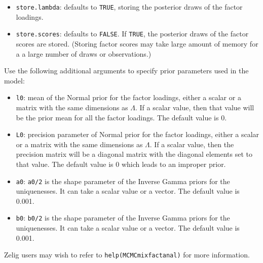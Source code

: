 \begin{itemize}
\item \texttt{store.lambda}: defaults to {\tt TRUE}, storing the
posterior draws of the factor loadings.  

\item \texttt{store.scores}: defaults to {\tt FALSE}.  If {\tt TRUE},
the posterior draws of the factor scores are stored. (Storing factor
scores may take large amount of memory for a a large number of draws
or observations.)

\end{itemize}
Use the following additional arguments to specify prior parameters used in the model:
\begin{itemize}

\item \texttt{l0}: mean of the Normal prior for the factor
loadings, either a scalar or a matrix with the same dimensions as
$\Lambda$.  If a scalar value, then that value will be the prior mean
for all the factor loadings. The default value is 0.

\item \texttt{L0}: precision parameter of Normal prior for the factor
loadings, either a scalar or a matrix with the same dimensions as $\Lambda$.  
If a scalar value, then the precision matrix will be 
a diagonal matrix with the diagonal elements set to that value. 
The default value is 0 which leads to an improper prior.

\item \texttt{a0}: {\tt a0/2} is the shape parameter of the Inverse Gamma priors for 
the uniquenesses. It can take a scalar value or a vector. The default
value is 0.001.

\item \texttt{b0}: {\tt b0/2} is the shape parameter of the Inverse Gamma priors for 
the uniquenesses. It can take a scalar value or a vector. The default
value is 0.001.

\end{itemize}
Zelig users may wish to refer to \texttt{help(MCMCmixfactanal)} for more 
information.



